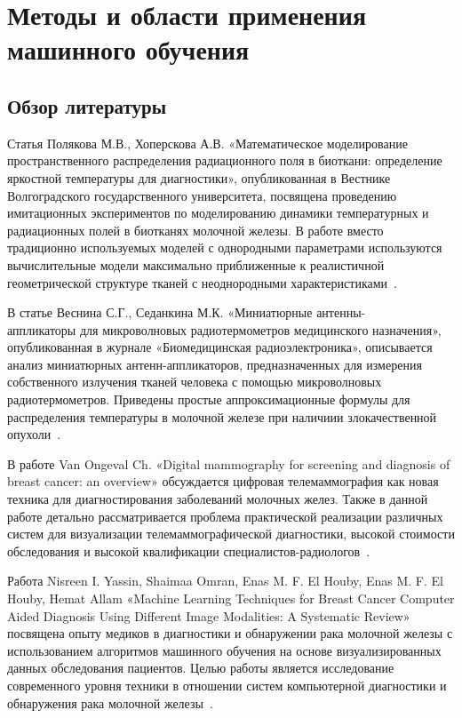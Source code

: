 \newpage
\section{\Large Методы и области применения машинного обучения}\vspace{-7mm}

\subsection{Обзор литературы}
\par
Статья Полякова М.В., Хоперскова А.В. «Математическое моделирование пространственного распределения радиационного поля в биоткани: определение яркостной температуры для диагностики», опубликованная в Вестнике Волгоградского государственного университета, посвящена проведению имитационных экспериментов по моделированию динамики температурных и радиационных полей в биотканях молочной железы. В работе вместо традиционно используемых моделей с однородными параметрами используются вычислительные модели максимально приближенные к реалистичной геометрической структуре тканей с неоднородными характеристиками~\cite{polyakovKhoperskov}.
\par
В статье Веснина С.Г., Седанкина М.К. «Миниатюрные антенны-\\аппликаторы для микроволновых радиотермометров медицинского назначения», опубликованная в журнале «Биомедицинская радиоэлектроника», описывается анализ миниатюрных антенн-аппликаторов, предназначенных для измерения собственного излучения тканей человека с помощью микроволновых радиотермометров. Приведены простые аппроксимационные формулы для распределения температуры в молочной железе при наличиии злокачественной опухоли~\cite{vesninMinAntenn}.
\par
В работе Van Ongeval Ch. «Digital mammography for screening and diagnosis of breast cancer: an overview» обсуждается цифровая телемаммография как новая техника для диагностирования заболеваний молочных желез. Также в данной работе детально рассматривается проблема практической реализации различных систем для визуализации телемаммографической диагностики, высокой стоимости обследования и высокой квалификации специалистов-радиологов~\cite{vanOngeval}.
\par
Работа Nisreen I. Yassin, Shaimaa Omran, Enas M. F. El Houby, Enas M. F. El Houby, Hemat Allam «Machine Learning Techniques for Breast Cancer Computer Aided Diagnosis Using Different Image Modalities: A Systematic Review» посвящена опыту медиков в диагностики и обнаружении рака молочной железы с использованием алгоритмов машинного обучения на основе визуализированных данных обследования пациентов. Целью работы является исследование современного уровня техники в отношении систем компьютерной диагностики и обнаружения рака молочной железы~\cite{nisrenml}.
